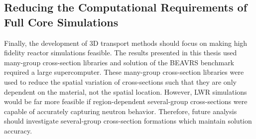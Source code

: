 \subsection{Reducing the Computational Requirements of Full Core Simulations}
	
Finally, the development of 3D transport methods should focus on making high fidelity reactor simulations feasible. The results presented in this thesis used many-group cross-section libraries and solution of the BEAVRS benchmark required a large supercomputer. These many-group cross-section libraries were used to reduce the spatial variation of cross-sections such that they are only dependent on the material, not the spatial location. However, \ac{LWR} simulations would be far more feasible if region-dependent several-group cross-sections were capable of accurately capturing neutron behavior. Therefore, future analysis should investigate several-group cross-section formations which maintain solution accuracy.